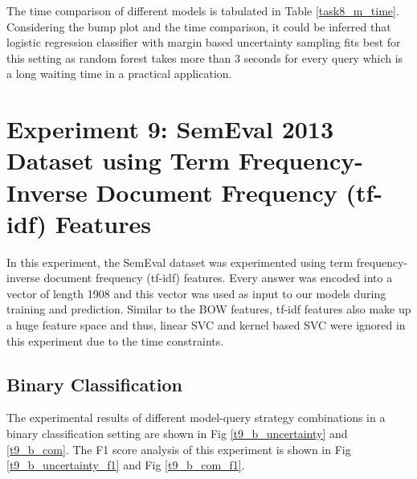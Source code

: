 	
	The time comparison of different models is tabulated in Table \ref{task8_m_time}. Considering the bump plot and the time comparison, it could be inferred that logistic regression classifier with margin based uncertainty sampling fits best for this setting as random forest takes more than 3 seconds for every query which is a long waiting time in a practical application.
	
	
\clearpage

\section{Experiment 9: SemEval 2013 Dataset using Term Frequency-Inverse Document Frequency (tf-idf) Features}

In this experiment, the SemEval dataset was experimented using term frequency-inverse document frequency (tf-idf) features. Every answer was encoded into a vector of length 1908 and this vector was used as input to our models during training and prediction. Similar to the BOW features, tf-idf features also make up a huge feature space and thus, linear SVC and kernel based SVC were ignored in this experiment due to the time constraints.    

\subsection{Binary Classification}

The experimental results of different model-query strategy combinations in a binary classification setting are shown in Fig \ref{t9_b_uncertainty} and \ref{t9_b_com}. The F1 score analysis of this experiment is shown in Fig \ref{t9_b_uncertainty_f1} and Fig \ref{t9_b_com_f1}. 

